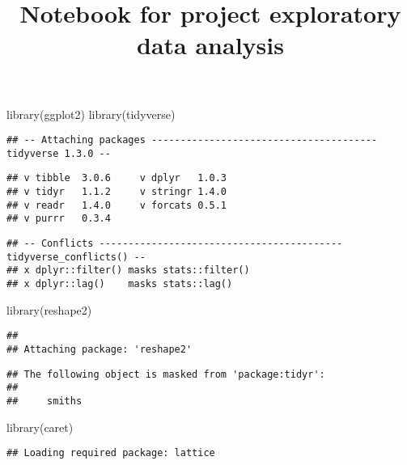 \documentclass[
]{article}
\title{Notebook for project exploratory data analysis}
\author{}
\date{\vspace{-2.5em}}
\newenvironment{Shaded}{\begin{snugshade}}{\end{snugshade}}
\newcommand{\FunctionTok}[1]{\textcolor[rgb]{0.00,0.00,0.00}{#1}}
\newcommand{\NormalTok}[1]{#1}
\begin{document}
\maketitle

\begin{Shaded}
\begin{Highlighting}[]
\FunctionTok{library}\NormalTok{(ggplot2)}
\FunctionTok{library}\NormalTok{(tidyverse)}
\end{Highlighting}
\end{Shaded}

\begin{verbatim}
## -- Attaching packages --------------------------------------- tidyverse 1.3.0 --
\end{verbatim}

\begin{verbatim}
## v tibble  3.0.6     v dplyr   1.0.3
## v tidyr   1.1.2     v stringr 1.4.0
## v readr   1.4.0     v forcats 0.5.1
## v purrr   0.3.4
\end{verbatim}

\begin{verbatim}
## -- Conflicts ------------------------------------------ tidyverse_conflicts() --
## x dplyr::filter() masks stats::filter()
## x dplyr::lag()    masks stats::lag()
\end{verbatim}

\begin{Shaded}
\begin{Highlighting}[]
\FunctionTok{library}\NormalTok{(reshape2)}
\end{Highlighting}
\end{Shaded}

\begin{verbatim}
## 
## Attaching package: 'reshape2'
\end{verbatim}

\begin{verbatim}
## The following object is masked from 'package:tidyr':
## 
##     smiths
\end{verbatim}

\begin{Shaded}
\begin{Highlighting}[]
\FunctionTok{library}\NormalTok{(caret)}
\end{Highlighting}
\end{Shaded}

\begin{verbatim}
## Loading required package: lattice
\end{verbatim}
\end{document}
